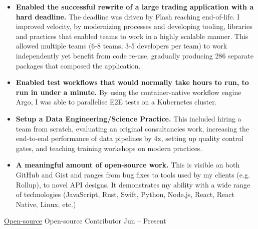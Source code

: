 \documentclass[10pt,a4paper]{article}
\begin{document}
\begin{indentsection}
\item
\begin{itemize}[leftmargin=0cm]

    \item \textbf{Enabled the successful rewrite of a large trading application with a hard deadline.} The deadline was driven by Flash reaching end-of-life. I improved velocity, by modernizing processes and developing tooling, libraries and practices that enabled teams to work in a highly scalable manner. This allowed multiple teams (6-8 teams, 3-5 developers per team) to work independently yet benefit from code re-use, gradually producing 286 separate packages that composed the application.

    \item \textbf{Enabled test workflows that would normally take hours to run, to run in under a minute.} By using the container-native workflow engine Argo, I was able to parallelise E2E tests on a Kubernetes cluster.

    \item \textbf{Setup a Data Engineering/Science Practice.} This included hiring a team from scratch, evaluating an original consultancies work, increasing the end-to-end performance of data pipelines by 4x, setting up quality control gates, and teaching training workshops on modern practices.

    \item \textbf{A meaningful amount of open-source work.} This is visible on both GitHub and Gist and ranges from bug fixes to tools used by my clients (e.g. Rollup), to novel API designs. It demonstrates my ability with a wide range of technologies (JavaScript, Rust, Swift, Python, Node.js, React, React Native, Linux, etc.)

\end{itemize}
\end{indentsection}


\headedsection  %
  {\href{http://github.com/sebinsua}{Open-source}}
  {} {%
  \headedsubsection  %
    {Open-source Contributor}
    {Jun  -- Present}
    {}
}
\end{document}
